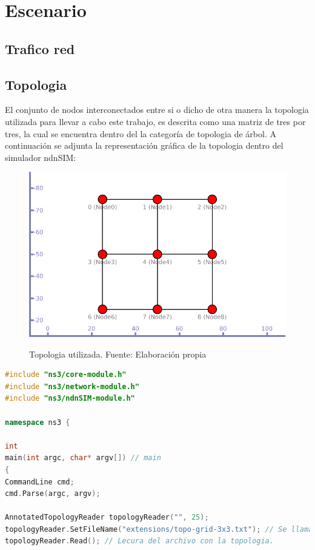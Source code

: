 \documentclass[12pt]{ociamthesis}  %
\begin{document}
\section{Escenario}

\subsection{Trafico red}

\subsection{Topologia}

El conjunto de nodos interconectados entre si o dicho de otra manera la topologia utilizada para llevar a cabo este trabajo, es descrita como una matriz de tres por tres, la cual se encuentra dentro del la categoría de topologia de árbol. A continuación se adjunta la representación gráfica de la topologia dentro del simulador ndnSIM:

\begin{figure}[!htb]
	\centering
	\includegraphics[width=12cm]{Imagenes/Matriz3x3.pdf}\\
	\caption{Topologia utilizada. Fuente: Elaboración propia}
	\label{}
\end{figure}

\begin{lstlisting}[language=cpp,caption={Caption}]
#include "ns3/core-module.h"
#include "ns3/network-module.h"
#include "ns3/ndnSIM-module.h"

namespace ns3 {

int
main(int argc, char* argv[]) // main
{
CommandLine cmd;
cmd.Parse(argc, argv);

AnnotatedTopologyReader topologyReader("", 25); 
topologyReader.SetFileName("extensions/topo-grid-3x3.txt"); // Se llama al archivo 
topologyReader.Read(); // Lecura del archivo con la topologia.
\end{lstlisting}
\end{document}
